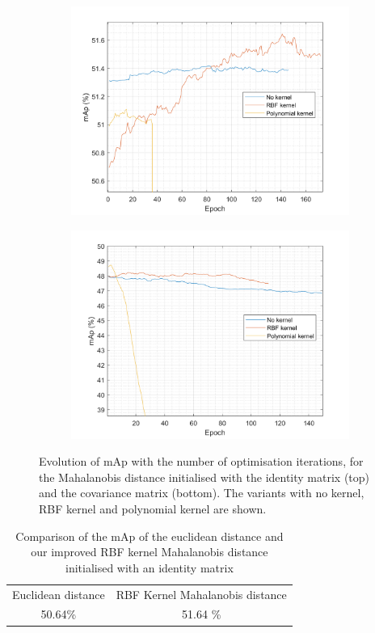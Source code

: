 \documentclass[10pt,technote]{IEEEtran}
\begin{document}
\begin{figure}
\begin{subfigure}{\linewidth}
    \centering
    \includegraphics[width=\linewidth]{Graphs/I_init_comparison.png}
    
    
\end{subfigure}
\begin{subfigure}{\linewidth}
    \centering
    \includegraphics[width=\linewidth]{Graphs/cov_init_comparison.png}
\end{subfigure}
\caption{Evolution of mAp with the number of optimisation iterations, for the Mahalanobis distance initialised with the identity matrix (top) and the covariance matrix (bottom). The variants with no kernel, RBF kernel and polynomial kernel are shown.}
\label{fig:comparison_init}
\end{figure}
\begin{table}
    \centering
    \begin{tabular}{c|c}
        Euclidean distance & RBF Kernel Mahalanobis distance \\
        50.64\% & 51.64 \%
    \end{tabular}
    \caption{Comparison of the mAp of the euclidean distance and our improved RBF kernel Mahalanobis distance initialised with an identity matrix}
    \label{tab:my_label}
\end{table}
\appendices
\end{document}
